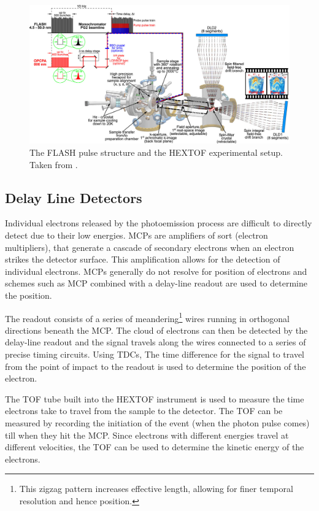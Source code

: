 \begin{figure}
    \centering
    \includegraphics[width=1\linewidth]{images/2024-08-27-10-50-01.png}
    \caption{The \gls{FLASH} pulse structure and the \gls{HEXTOF} experimental setup. Taken from \cite{kutnyakhovTimeMomentumresolvedPhotoemission2020}.}
    \label{fig:hex-tof}
\end{figure}


\subsection{Delay Line Detectors}\label{section:dld}
Individual electrons released by the photoemission process are difficult to directly detect due to their low energies. \Glspl{MCP} are amplifiers of sort (electron multipliers), that generate a cascade of secondary electrons when an electron strikes the detector surface. This amplification allows for the detection of individual electrons. \Glspl{MCP} generally do not resolve for position of electrons and schemes such as \gls{MCP} combined with a delay-line readout are used to determine the position. 

The readout consists of a series of meandering\footnote{This zigzag pattern increases effective length, allowing for finer temporal resolution and hence position.} wires running in orthogonal directions beneath the \gls{MCP}. The cloud of electrons can then be detected by the delay-line readout and the signal travels along the wires connected to a series of precise timing circuits. Using \glspl{TDC}, The time difference for the signal to travel from the point of impact to the readout is used to determine the position of the electron.


The \gls{TOF} tube built into the \gls{HEXTOF} instrument is used to measure the time electrons take to travel from the sample to the detector. The \gls{TOF} can be measured by recording the initiation of the event (when the photon pulse comes) till when they hit the \gls{MCP}. Since electrons with different energies travel at different velocities, the \gls{TOF} can be used to determine the kinetic energy of the electrons. 

